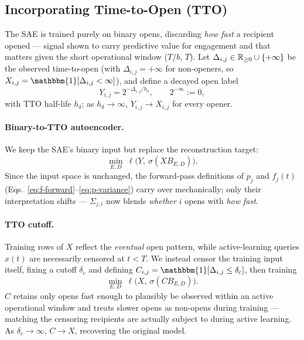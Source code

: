 \subsection{Incorporating Time-to-Open (TTO)}
\label{sec:tto}

The SAE is trained purely on binary opens, discarding \emph{how fast} a
recipient opened --- signal shown to carry predictive value for engagement
\citep{sinha2018modeling} and that matters given the short operational
window ($T/b$, $T$). Let $\Delta_{i,j}\in\mathbb{R}_{\ge0}\cup\{+\infty\}$ be the
observed time-to-open (with $\Delta_{i,j}=+\infty$ for non-openers, so
$X_{i,j}=\mathbbm{1}[\Delta_{i,j}<\infty]$), and define a decayed open
label
\begin{equation}
\label{eq:Y-decay}
Y_{i,j} = 2^{-\Delta_{i,j}/h_\delta}, \qquad 2^{-\infty} := 0,
\end{equation}
with TTO half-life $h_\delta$; as $h_\delta\to\infty$, $Y_{i,j}\to
X_{i,j}$ for every opener.

\paragraph{Binary-to-TTO autoencoder.}
We keep the SAE's binary input but replace the reconstruction target:
\begin{equation}
\label{eq:binary-to-tto}
\min_{E,D}\ \ell\big(Y,\ \sigma(XB_{E,D})\big).
\end{equation}
Since the input space is unchanged, the forward-pass definitions of $p_j$
and $f_j(t)$ (Eqs.~\eqref{eq:f-forward}--\eqref{eq:p-variance}) carry over
mechanically; only their interpretation shifts --- $\Sigma_{j,i}$ now
blends \emph{whether} $i$ opens with \emph{how fast}.

\paragraph{TTO cutoff.}
Training rows of $X$ reflect the \emph{eventual} open pattern, while
active-learning queries $x(t)$ are necessarily censored at $t < T$. We
instead censor the training input itself, fixing a cutoff $\delta_c$ and
defining $C_{i,j} = \mathbbm{1}[\Delta_{i,j}\le\delta_c]$, then training
\begin{equation}
\label{eq:tto-cutoff}
\min_{E,D}\ \ell\big(X,\ \sigma(CB_{E,D})\big).
\end{equation}
$C$ retains only opens fast enough to plausibly be observed within an
active operational window and treats slower opens as non-opens during
training --- matching the censoring recipients are actually subject to
during active learning. As $\delta_c\to\infty$, $C\to X$, recovering the
original model.
